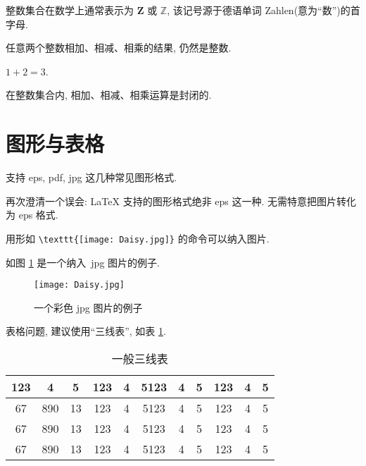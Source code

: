 \documentclass{WHUMaster}   %
\begin{document}
\begin{remark}
  整数集合在数学上通常表示为 $\mathbf{Z}$ 或 $\mathbb{Z}$, 该记号源于德语单词 Zahlen(意为``数'')的首字母.
\end{remark}

\begin{proposition}
任意两个整数相加、相减、相乘的结果, 仍然是整数.
\end{proposition}

\begin{example}
  $1+2=3$.
\end{example}

\begin{corollary}
   在整数集合内, 相加、相减、相乘运算是封闭的.
\end{corollary}

\section{图形与表格}

支持 eps, pdf, jpg 这几种常见图形格式.

再次澄清一个误会: \LaTeX{} 支持的图形格式绝非 eps 这一种. 无需特意把图片转化为 eps 格式.

用形如 \verb|\texttt{[image: Daisy.jpg]}| 的命令可以纳入图片.

如图 \ref{fig:1} 是一个纳入~jpg 图片的例子.

\begin{figure}[ht]
\centering
  \texttt{[image: Daisy.jpg]}
  \caption{一个彩色 jpg 图片的例子}
  \label{fig:1}
\end{figure}

表格问题, 建议使用``三线表'', 如表 \ref{tab:1}.

\begin{table}[ht]
\centering
\caption{一般三线表}
\label{tab:1}
    \begin{tabular}{c c c c c c c c c c c}
    \hline
    123 & 4  & 5  & 123 & 4 & 5123 & 4 & 5 & 123 & 4 & 5\\
    \hline
    67 & 890 & 13 & 123 & 4 & 5123 & 4 & 5 & 123 & 4 & 5\\
    67 & 890 & 13 & 123 & 4 & 5123 & 4 & 5 & 123 & 4 & 5\\
    67 & 890 & 13 & 123 & 4 & 5123 & 4 & 5 & 123 & 4 & 5\\
    \hline
    \end{tabular}
\end{table}
\end{document}
